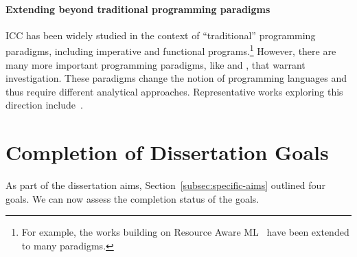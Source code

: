 \paragraph*{Extending beyond traditional programming paradigms}
ICC has been widely studied in the context of \enquote{traditional} programming
paradigms, including imperative and functional programs.\footnote{ For example,
the works building on Resource Aware ML~\cite{hoffmann2012} have
been extended to many paradigms.} However, there are many more important
programming paradigms, like  and , that warrant investigation. These paradigms change the notion of
programming languages and thus require different analytical approaches.
Representative works exploring this direction
include~\cite{dallago2010,avanzini2024,colledan2024,avanzini2020}.

\section{Completion of Dissertation Goals}
\label{sec:res-summary}

As part of the dissertation aims, Section~\autoref{subsec:specific-aims} outlined
four goals. We can now assess the completion status of the goals.

